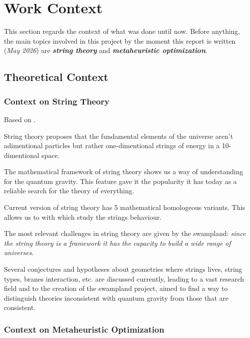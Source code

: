 
\chapter{Work Context}

This section regards the context of what was done until now.
Before anything, the main topics involved in this project by
the moment this report is written (\textit{May 2026}) are \textit{\textbf{string theory}} 
and \textit{\textbf{metaheuristic optimization}}.

\section{Theoretical Context}

\subsection{Context on String Theory}
\noindent Based on \cite{Becker2007,Rickles_2014}.

String theory proposes that the fundamental elements of the
universe aren't adimentional particles but rather
one-dimentional strings of energy in a 10-dimentional space.

The mathematical framework of string theory shows us a way
of understanding for the quantum gravity. This feature gave it
the popularity it has today as a reliable search for the
theory of everything.

Current version of string theory has 5 mathematical homologeous
variants. This allows us to  with which
study the strings behaviour.

The most relevant challenges in string theory are given by
the swampland: \textit{since the string theory is a framework it has
the capacity to build a wide range of universes}.

Several conjectures and hypotheses about geometries where
strings lives, string types, branes interaction, etc. are
discussed currently, leading to a vast research field and to
the creation of the swampland project, aimed to find a way to
distinguish theories inconsistent with quantum gravity from
those that are consistent.


\subsection{Context on Metaheuristic Optimization}

